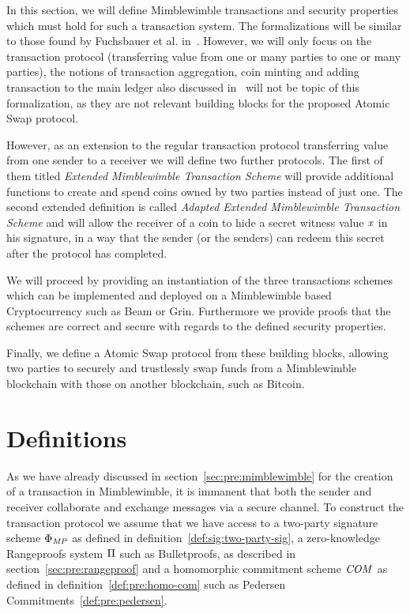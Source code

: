 In this section, we will define Mimblewimble transactions and security properties which must hold for such a transaction system. The formalizations will be similar to those found by Fuchsbauer et al. in~\cite{fuchsbauer2019aggregate}.
However, we will only focus on the transaction protocol (transferring value from one or many parties to one or many parties), the notions of transaction aggregation, coin minting and adding transaction to the main ledger also discussed in~\cite{fuchsbauer2019aggregate} will not be topic of this formalization, as
they are not relevant building blocks for the proposed Atomic Swap protocol.

However, as an extension to the regular transaction protocol transferring value from one sender to a receiver we will define two further protocols. The first of them titled \emph{Extended Mimblewimble Transaction Scheme}
will provide additional functions to create and spend coins owned by two parties instead of just one. The second extended definition is called \emph{Adapted Extended Mimblewimble Transaction Scheme} and will allow the receiver
of a coin to hide a secret witness value $\mathit{x}$ in his signature, in a way that the sender (or the senders) can redeem this secret after the protocol has completed.

We will proceed by providing an instantiation of the three transactions schemes which can be implemented and deployed on a Mimblewimble based Cryptocurrency such as Beam or Grin. Furthermore we provide proofs
that the schemes are correct and secure with regards to the defined security properties.

Finally, we define a Atomic Swap protocol from these building blocks, allowing two parties to securely and trustlessly swap funds from a Mimblewimble blockchain with those on another blockchain, such as Bitcoin.

\section{Definitions}\label{sec:atom:definitions}

As we have already discussed in section~\ref{sec:pre:mimblewimble} for the creation of a transaction in Mimblewimble, it is immanent that both the sender and receiver collaborate and exchange messages via a secure channel.
To construct the transaction protocol we assume that we have access to a two-party signature scheme $\Phi_{\mathit{MP}}$ as defined in definition~\ref{def:sig:two-party-sig}, a zero-knowledge Rangeproofs system $\Pi$
such as Bulletproofs, as described in section~\ref{sec:pre:rangeproof} and a homomorphic commitment scheme $\mathit{COM}$ as defined in definition~\ref{def:pre:homo-com} such as
Pedersen Commitments~\ref{def:pre:pedersen}.

